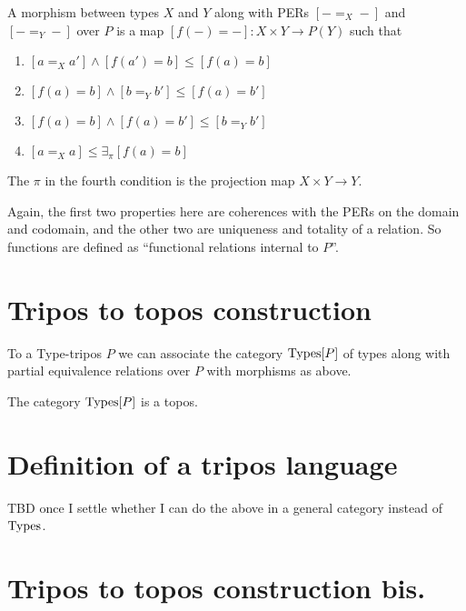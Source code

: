 \begin{definition}
    A morphism between types \(X\) and \(Y\) along with PERs \([-=_X-]\) and \([-=_Y-]\) over \(P\) is a map \([f(-)=-] : X×Y → P(Y)\) such that
    \begin{enumerate}
        \item \([a=_Xa']∧[f(a')=b]≤ [f(a) = b]\)
        \item \([f(a) = b]∧[b=_Yb'] ≤ [f(a) = b']\)
        \item \([f(a)=b]∧[f(a)=b'] ≤ [b=_Yb']\)
        \item \([a=_Xa] ≤ ∃_{π} [f(a) = b]\)
    \end{enumerate}
\end{definition}

\begin{remark}
    The \(π\) in the fourth condition is the projection map \(X×Y → Y\).
\end{remark}

Again, the first two properties here are coherences with the PERs on the domain and codomain, and the other two are uniqueness and totality of a relation. So functions are defined as ``functional relations internal to \(P\)''.

\section{Tripos to topos construction}

\begin{definition}
    To a Type-tripos \(P\) we can associate the category \(\textrm{Types}[P]\) of types along with partial equivalence relations over \(P\) with morphisms as above.
\end{definition}

\begin{theorem}[Pitts]
    The category \(\textrm{Types}[P]\) is a topos.
\end{theorem}


\section{Definition of a tripos language}

TBD once I settle whether I can do the above in a general category instead of \(\textrm{Types}\).

\section{Tripos to topos construction bis.}


